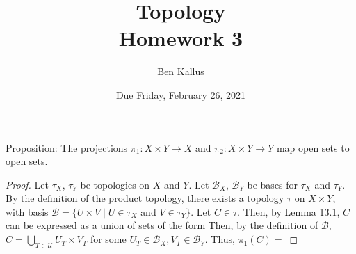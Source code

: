 \documentclass{article}
\date{Due Friday, February 26, 2021}
\author{Ben Kallus}
\title{Topology \\ Homework 3}
\newcommand{\B}{\mathcal B}
\begin{document}
\pagecolor{black}
\color{white}
\maketitle

 Proposition: The projections $\pi_1: X \times Y \to X$ and $\pi_2: X \times Y \to Y$ map open sets to open sets.
\begin{proof}
    Let $\tau_X$, $\tau_Y$ be topologies on $X$ and $Y$.
    Let $\B_X$, $\B_Y$ be bases for $\tau_X$ and $\tau_Y$.
    By the definition of the product topology, there exists a topology $\tau$ on $X \times Y$, with basis $\B = \{U \times V \mid U \in \tau_X \text{ and } V \in \tau_Y\}$.
    Let $C \in \tau$.
    Then, by Lemma 13.1, $C$ can be expressed as a union of sets of the form 
    Then, by the definition of $\B$, $C = \bigcup\limits_{T \in \mathcal U} U_T \times V_T$ for some $U_T \in \B_X, V_T \in \B_Y$.
    Thus, $\pi_1(C) = $
\end{proof}
\end{document}
